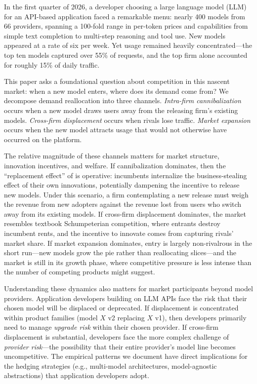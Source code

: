 \documentclass[11pt, a4paper]{article}
\begin{document}
In the first quarter of 2026, a developer choosing a large language model (LLM) for an API-based application faced a remarkable menu: nearly 400 models from 66 providers, spanning a 100-fold range in per-token prices and capabilities from simple text completion to multi-step reasoning and tool use. New models appeared at a rate of six per week. Yet usage remained heavily concentrated---the top ten models captured over 55\% of requests, and the top firm alone accounted for roughly 15\% of daily traffic.

This paper asks a foundational question about competition in this nascent market: when a new model enters, where does its demand come from? We decompose demand reallocation into three channels. \emph{Intra-firm cannibalization} occurs when a new model draws users away from the releasing firm's existing models. \emph{Cross-firm displacement} occurs when rivals lose traffic. \emph{Market expansion} occurs when the new model attracts usage that would not otherwise have occurred on the platform.

The relative magnitude of these channels matters for market structure, innovation incentives, and welfare. If cannibalization dominates, then the ``replacement effect'' of \citet{arrow1962economic} is operative: incumbents internalize the business-stealing effect of their own innovations, potentially dampening the incentive to release new models. Under this scenario, a firm contemplating a new release must weigh the revenue from new adopters against the revenue lost from users who switch away from its existing models. If cross-firm displacement dominates, the market resembles textbook Schumpeterian competition, where entrants destroy incumbent rents, and the incentive to innovate comes from capturing rivals' market share. If market expansion dominates, entry is largely non-rivalrous in the short run---new models grow the pie rather than reallocating slices---and the market is still in its growth phase, where competitive pressure is less intense than the number of competing products might suggest.

Understanding these dynamics also matters for market participants beyond model providers. Application developers building on LLM APIs face the risk that their chosen model will be displaced or deprecated. If displacement is concentrated within product families (model $X$ v2 replacing $X$ v1), then developers primarily need to manage \emph{upgrade risk} within their chosen provider. If cross-firm displacement is substantial, developers face the more complex challenge of \emph{provider risk}---the possibility that their entire provider's model line becomes uncompetitive. The empirical patterns we document have direct implications for the hedging strategies (e.g., multi-model architectures, model-agnostic abstractions) that application developers adopt.
\end{document}
